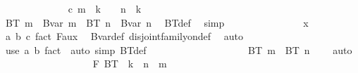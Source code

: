 \begin{isabellebody}
\ \ \ \ \ \ \ \ \ \ \ \ \isamarkupfalse%
\ c{\isacharcolon}{\kern0pt}\ {\isachardoublequoteopen}m\ {\isacharless}{\kern0pt}\ k\ {\isacharplus}{\kern0pt}\ {}\ {\isasymand}\ n\ {\isacharless}{\kern0pt}\ k\ {\isacharplus}{\kern0pt}\ {}{\isachardoublequoteclose}\isanewline
\ \ \ \ \ \ \ \ \ \ \ \ \isamarkupfalse%
\ \isamarkupfalse%
\ {\isachardoublequoteopen}BT\ m\ {\isacharequal}{\kern0pt}\ Bvar\ m\ {\isasymand}\ BT\ n\ {\isacharequal}{\kern0pt}\ Bvar\ n{\isachardoublequoteclose}\ \isamarkupfalse%
\ BT{\isacharunderscore}{\kern0pt}def\ \isamarkupfalse%
\ simp\isanewline
\ \ \ \ \ \ \ \ \ \ \ \ \isamarkupfalse%
\ \isamarkupfalse%
\ {\isachardoublequoteopen}x\ {\isasymin}\ {\isacharbraceleft}{\kern0pt}{\isacharbraceright}{\kern0pt}{\isachardoublequoteclose}\ \isamarkupfalse%
\ a\ b\ c\ fact{}\ F{}{\isacharunderscore}{\kern0pt}aux\ \isamarkupfalse%
\ Bvar{\isacharunderscore}{\kern0pt}def\ disjoint{\isacharunderscore}{\kern0pt}family{\isacharunderscore}{\kern0pt}on{\isacharunderscore}{\kern0pt}def\ \isamarkupfalse%
\ auto\isanewline
\ \ \ \ \ \ \ \ \ \ \isamarkupfalse%
\ {\isacharparenleft}{\kern0pt}use\ a\ b\ fact{}\ \ {\isacartoucheopen}auto\ simp{\isacharcolon}{\kern0pt}\ BT{\isacharunderscore}{\kern0pt}def{\isacartoucheclose}{\isacharparenright}{\kern0pt}\isanewline
\ \ \ \ \ \ \ \ \isamarkupfalse%
\isanewline
\ \ \ \ \ \ \ \ \isamarkupfalse%
\ \isamarkupfalse%
\ {\isachardoublequoteopen}BT\ m\ {\isasyminter}\ BT\ n\ {\isacharequal}{\kern0pt}\ {\isacharbraceleft}{\kern0pt}{\isacharbraceright}{\kern0pt}{\isachardoublequoteclose}\ \isamarkupfalse%
\ auto\isanewline
\ \ \ \ \ \ \isamarkupfalse%
\isanewline
\ \ \ \ \isacommand{{\isacharbraceright}{\kern0pt}}\isamarkupfalse%
\isanewline
\ \ \ \ \isamarkupfalse%
\ \isamarkupfalse%
\ F{}{\isacharcolon}{\kern0pt}\ {\isachardoublequoteopen}{\isasymUnion}{\isacharparenleft}{\kern0pt}BT\ {\isacharbackquote}{\kern0pt}\ {\isacharbraceleft}{\kern0pt}{\isachardot}{\kern0pt}{\isachardot}{\kern0pt}k{\isacharplus}{\kern0pt}{}{\isacharbraceright}{\kern0pt}{\isacharparenright}{\kern0pt}\ {\isacharequal}{\kern0pt}\ {\isacharbraceleft}{\kern0pt}{\isachardot}{\kern0pt}{\isachardot}{\kern0pt}{\isacharless}{\kern0pt}n\ {\isacharplus}{\kern0pt}\ m{\isacharbraceright}{\kern0pt}{\isachardoublequoteclose}\isanewline

\end{isabellebody}
